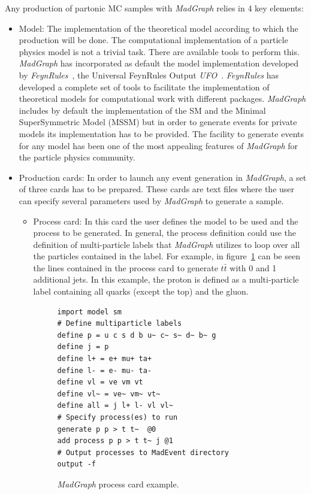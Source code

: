 Any production of partonic MC samples with \textit{MadGraph} relies in 4 key elements:
\begin{itemize}
\item Model: The implementation of the theoretical model according to which the production will be done. The computational implementation of a particle physics model is not a trivial task. There are available tools to perform this. \textit{MadGraph} has incorporated as default the model implementation developed by \textit{FeynRules}~\cite{Alloul:2013bka}, the Universal FeynRules Output \textit{UFO}~\cite{Degrande:2011ua}. \textit{FeynRules} has developed a complete set of tools to facilitate the implementation of theoretical models for computational work with different packages. \textit{MadGraph} includes by default the implementation of the SM and the Minimal SuperSymmetric Model (MSSM) but in order to generate events for private models its implementation has to be provided. The facility to generate events for any model has been one of the most appealing features of \textit{MadGraph} for the particle physics community.
\item Production cards: In order to launch any event generation in \textit{MadGraph}, a set of three cards has to be prepared. These cards are text files where the user can specify several parameters used by \textit{MadGraph} to generate a sample.
  \begin{itemize}
  \item Process card: In this card the user defines the model to be used and the process to be generated. In general, the process definition could use the definition of multi-particle labels that  \textit{MadGraph} utilizes to loop over all the particles contained in the label. For example, in figure~\ref{fig:ProcCard} can be seen the lines contained in the process card to generate $t\bar{t}$ with 0 and 1 additional jets. In this example, the proton is defined as a multi-particle label containing all quarks (except the top) and the gluon. 
    \begin{figure}[!Hhtbp]
      \begin{center}
        \begin{minipage}[c]{0.45\textwidth}
\begin{verbatim}
import model sm
# Define multiparticle labels
define p = u c s d b u~ c~ s~ d~ b~ g
define j = p
define l+ = e+ mu+ ta+
define l- = e- mu- ta-
define vl = ve vm vt
define vl~ = ve~ vm~ vt~
define all = j l+ l- vl vl~
# Specify process(es) to run
generate p p > t t~  @0
add process p p > t t~ j @1
# Output processes to MadEvent directory
output -f
\end{verbatim}
        \end{minipage}
          \caption{\textit{MadGraph} process card example.}
          \label{fig:ProcCard}
      \end{center}
    \end{figure}
    

\end{itemize}
\end{itemize}
